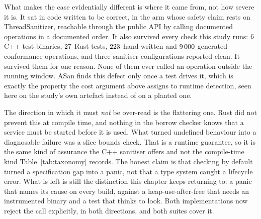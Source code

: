 \documentclass[english,oneside,a4paper,censored,csm,software-track-2020]{HYthesisML}
\begin{document}
What makes the case evidentially different is where it came from, not how severe it is. It sat in
code written to be correct, in the arm whose safety claim rests on ThreadSanitizer, reachable
through the public API by calling documented operations in a documented order. It also survived
every check this study runs: $6$ C++ test binaries, $27$ Rust tests,
$223$ hand-written and $9\,000$ generated conformance operations, and three
sanitiser configurations reported clean. It survived them for one reason. None of them ever called an operation outside the
running window. ASan finds this defect only once a test drives it, which is exactly the property
the cost argument above assigns to runtime detection, seen here on the study's own artefact instead
of on a planted one.

The direction in which it must \emph{not} be over-read is the flattering one. Rust did not
prevent this at compile time, and nothing in the borrow checker knows that a service must be
started before it is used. What turned undefined behaviour into a diagnosable failure was a
slice bounds check. That is a runtime guarantee, so it is the same kind of assurance the
C++ sanitiser offers and not the compile-time kind Table~\ref{tab:taxonomy} records. The
honest claim is that checking by default turned a specification gap into a panic, not that a
type system caught a lifecycle error. What is left is still the distinction this chapter keeps
returning to: a panic that names its cause on every build, against a heap-use-after-free that
needs an instrumented binary and a test that thinks to look. Both implementations now reject the
call explicitly, in both directions, and both suites cover it.
\end{document}
